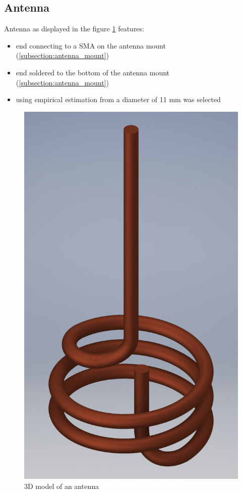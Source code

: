 \clearpage
\subsection{Antenna}
\label{subsection:antenna}
Antenna as displayed in the figure \ref{fig:antenna} features:
\begin{itemize}
	\item end connecting to a SMA on the antenna mount (\ref{subsection:antenna_mount})
	\item end soldered to the bottom of the antenna mount (\ref{subsection:antenna_mount})
	\item using empirical estimation from \cite{Siverns2012} a diameter of 11 mm was selected
\end{itemize}

\begin{figure}[h]
	\centering
	\includegraphics[width=.73\textwidth]{images/antenna_small}
	\caption{3D model of an antenna}
	\label{fig:antenna}
\end{figure}
